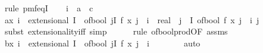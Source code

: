 \begin{isabellebody}
%
\isadelimproof
%
\endisadelimproof
%
\isatagproof
{}\isamarkupfalse%
\ {\isacharparenleft}{\kern0pt}rule\ pmf{\isacharunderscore}{\kern0pt}eqI{\isacharparenright}{\kern0pt}\isanewline
\ \ \isamarkupfalse%
\ i\ {\isacharcolon}{\kern0pt}{\isacharcolon}{\kern0pt}\ {\isachardoublequoteopen}{\isacharprime}{\kern0pt}a\ {\isasymRightarrow}\ {\isacharprime}{\kern0pt}c{\isachardoublequoteclose}\isanewline
\isanewline
\ \ \isamarkupfalse%
\ a{\isacharcolon}{\kern0pt}{\isachardoublequoteopen}{\isasymAnd}x{\isachardot}{\kern0pt}\ i\ {\isasymin}\ extensional\ I\ {\isasymLongrightarrow}\ {\isacharparenleft}{\kern0pt}of{\isacharunderscore}{\kern0pt}bool\ {\isacharparenleft}{\kern0pt}{\isacharparenleft}{\kern0pt}{\isasymlambda}j{\isasymin}I{\isachardot}{\kern0pt}\ f\ {\isacharparenleft}{\kern0pt}x\ j{\isacharparenright}{\kern0pt}{\isacharparenright}{\kern0pt}\ {\isacharequal}{\kern0pt}\ i{\isacharparenright}{\kern0pt}\ {\isacharcolon}{\kern0pt}{\isacharcolon}{\kern0pt}\ real{\isacharparenright}{\kern0pt}\ {\isacharequal}{\kern0pt}\ {\isacharparenleft}{\kern0pt}{\isasymProd}j\ {\isasymin}\ I{\isachardot}{\kern0pt}\ of{\isacharunderscore}{\kern0pt}bool\ {\isacharparenleft}{\kern0pt}f\ {\isacharparenleft}{\kern0pt}x\ j{\isacharparenright}{\kern0pt}\ {\isacharequal}{\kern0pt}\ i\ j{\isacharparenright}{\kern0pt}{\isacharparenright}{\kern0pt}{\isachardoublequoteclose}\isanewline
\ \ \ \ \isamarkupfalse%
\ {\isacharparenleft}{\kern0pt}subst\ extensionality{\isacharunderscore}{\kern0pt}iff{\isacharcomma}{\kern0pt}\ simp{\isacharparenright}{\kern0pt}\isanewline
\ \ \ \ \isamarkupfalse%
\ {\isacharparenleft}{\kern0pt}rule\ of{\isacharunderscore}{\kern0pt}bool{\isacharunderscore}{\kern0pt}prod{\isacharbrackleft}{\kern0pt}OF\ assms{\isacharparenleft}{\kern0pt}{}{\isacharparenright}{\kern0pt}{\isacharbrackright}{\kern0pt}{\isacharparenright}{\kern0pt}\isanewline
\isanewline
\ \ \isamarkupfalse%
\ b{\isacharcolon}{\kern0pt}{\isachardoublequoteopen}{\isasymAnd}x{\isachardot}{\kern0pt}\ i\ {\isasymnotin}\ extensional\ I\ {\isasymLongrightarrow}\ of{\isacharunderscore}{\kern0pt}bool\ {\isacharparenleft}{\kern0pt}{\isacharparenleft}{\kern0pt}{\isasymlambda}j{\isasymin}I{\isachardot}{\kern0pt}\ f\ {\isacharparenleft}{\kern0pt}x\ j{\isacharparenright}{\kern0pt}{\isacharparenright}{\kern0pt}\ {\isacharequal}{\kern0pt}\ i{\isacharparenright}{\kern0pt}\ {\isacharequal}{\kern0pt}\ {}{\isachardoublequoteclose}\isanewline
\ \ \ \ \isamarkupfalse%
\ auto\isanewline

\end{isabellebody}
